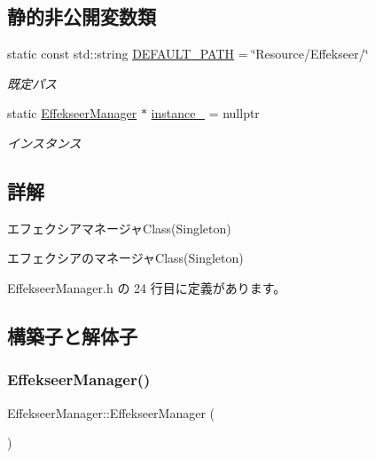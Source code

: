 \subsection*{静的非公開変数類}
\begin{DoxyCompactItemize}
\item 
static const std\+::string \mbox{\hyperlink{class_effekseer_manager_a9a849a395605383e9c7e7850379e8b22}{D\+E\+F\+A\+U\+L\+T\+\_\+\+P\+A\+TH}} = \char`\"{}Resource/Effekseer/\char`\"{}
\begin{DoxyCompactList}\small\item\em 既定パス \end{DoxyCompactList}\item 
static \mbox{\hyperlink{class_effekseer_manager}{Effekseer\+Manager}} $\ast$ \mbox{\hyperlink{class_effekseer_manager_afc6d832b282eab2d2c6f89a889b11706}{instance\+\_\+}} = nullptr
\begin{DoxyCompactList}\small\item\em インスタンス \end{DoxyCompactList}\end{DoxyCompactItemize}


\subsection{詳解}
エフェクシアマネージャ\+Class(\+Singleton) 

エフェクシアのマネージャ\+Class(\+Singleton) 

 Effekseer\+Manager.\+h の 24 行目に定義があります。



\subsection{構築子と解体子}
\mbox{\label{class_effekseer_manager_acdc424090c46bb80cb0a70bae7245c01}} 
\subsubsection{\texorpdfstring{Effekseer\+Manager()}{EffekseerManager()}}
{\footnotesize\ttfamily Effekseer\+Manager\+::\+Effekseer\+Manager (\begin{DoxyParamCaption}{ }\end{DoxyParamCaption})\hspace{0.3cm}{\ttfamily [private]}}



